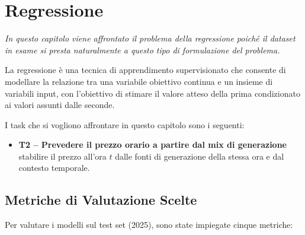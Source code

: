 \chapter{Regressione} %

\begin{preamble}
{\em In questo capitolo viene affrontato il problema della regressione poiché il dataset in esame si presta naturalmente a questo tipo di
formulazione del problema.}
\end{preamble}

La regressione è una tecnica di apprendimento supervisionato che consente
di modellare la relazione tra una variabile obiettivo continua e un
insieme di variabili input, con l'obiettivo di stimare il valore atteso
della prima condizionato ai valori assunti dalle seconde.

I task che si vogliono affrontare in questo capitolo sono i seguenti:

\begin{itemize}
    \item \textbf{T2 -- Prevedere il prezzo orario a partire dal mix di generazione}\\
    stabilire il prezzo all'ora $t$
    dalle fonti di generazione della stessa ora e dal contesto temporale.
\end{itemize}

\section{Metriche di Valutazione Scelte}
\label{sec:t2_regressione_metriche}
Per valutare i modelli sul test set (2025), sono state impiegate cinque metriche:

